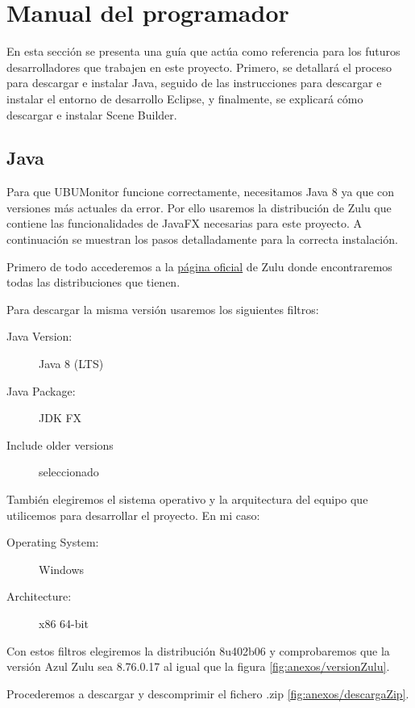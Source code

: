 \section{Manual del programador}

En esta sección se presenta una guía que actúa como referencia para los futuros desarrolladores que trabajen en este proyecto. Primero, se detallará el proceso para descargar e instalar Java, seguido de las instrucciones para descargar e instalar el entorno de desarrollo Eclipse, y finalmente, se explicará cómo descargar e instalar Scene Builder.

\subsection{Java}

Para que UBUMonitor funcione correctamente, necesitamos Java 8 ya que con versiones más actuales da error. Por ello usaremos la distribución de Zulu que contiene las funcionalidades de JavaFX necesarias para este proyecto. A continuación se muestran los pasos detalladamente para la correcta instalación.

Primero de todo accederemos a la \href{https://www.azul.com/downloads/#zulu}{página oficial} de Zulu donde encontraremos todas las distribuciones que tienen.


Para descargar la misma versión usaremos los siguientes filtros:
\begin{description}
    \item[Java Version:] Java 8 (LTS) 
    \item[Java Package:] JDK FX
    \item[Include older versions] seleccionado
\end{description}

También elegiremos el sistema operativo y la arquitectura del equipo que utilicemos para desarrollar el proyecto. En mi caso:
\begin{description}
    \item[Operating System:] Windows
    \item[Architecture:] x86 64-bit
\end{description}

Con estos filtros elegiremos la distribución 8u402b06 y comprobaremos que la versión Azul Zulu sea 8.76.0.17 al igual que la figura \ref{fig:anexos/versionZulu}.

Procederemos a descargar y descomprimir el fichero .zip \ref{fig:anexos/descargaZip}.

